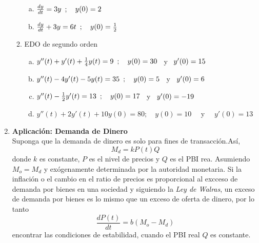\documentclass[10pt,a4paper]{article}
\begin{document}
\begin{enumerate}
\begin{enumerate}[2.1]
\begin{enumerate}[a)]
							\item $\frac{dy}{dt}=3y\enskip; \quad y(0)=2$
							\item $\frac{dy}{dt}+3y=6t\enskip; \quad y(0)=\frac{1}{2}$
						\end{enumerate}
					\item EDO de segundo orden
						\begin{enumerate}[a)]
							\item $y''(t)+y'(t)+\frac{1}{4}y(t)=9 \enskip;\quad y(0)=30\enskip$ y $\enskip y'(0)=15$
							\item $y''(t)-4y'(t)-5y(t)=35\enskip;\quad y(0)=5\enskip$ y $\enskip y'(0)=6$
							\item $y''(t)-\frac{1}{2}y'(t)=13\enskip;\quad y(0)=17\enskip$ y $\enskip y'(0)=-19$
							\item $y''(t)+2y'(t)+10y(0)=80;\quad y(0)=10\quad$ y $\quad y'(0)=13$
						\end{enumerate}
				\end{enumerate}
		\item \textbf{Aplicación: Demanda de Dinero}\\
		 Suponga que la demanda de dinero es solo para fines de transacción.Así, $$M_d = kP(t)Q$$ donde $k$ es constante, $P$ es el nivel de precios y $Q$ es el PBI rea. Asumiendo $M_o=M_d$ y exógenamente determinada por la autoridad monetaria. Si la inflación o el cambio en el ratio de precios es proporcional al excceso de demanda por bienes en una sociedad y siguiendo la \textit{Ley de Walras}, un exceso de demanda por bienes es lo mismo que un exceso de oferta de dinero, por lo tanto $$\frac{dP(t)}{dt}=b(M_o-M_d)$$ encontrar las condiciones de estabilidad, cuando el PBI real $Q$ es constante.
	\end{enumerate}
\end{document}
